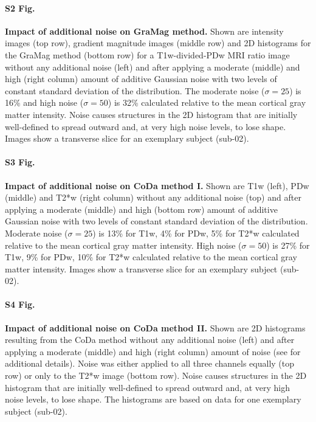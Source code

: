 \paragraph{S2 Fig.}
\label{S2_Fig}
{\bf Impact of additional noise on GraMag method.} Shown are intensity images (top row), gradient magnitude images (middle row) and 2D histograms for the GraMag method (bottom row) for a T1w-divided-PDw MRI ratio image without any additional noise (left) and after applying a moderate (middle) and high (right column) amount of additive Gaussian noise with two levels of constant standard deviation of the distribution. The moderate noise ($\sigma=25$) is 16\% and high noise ($\sigma=50$) is 32\% calculated relative to the mean cortical gray matter intensity. Noise causes structures in the 2D histogram that are initially well-defined to spread outward and, at very high noise levels, to lose shape. Images show a transverse slice for an exemplary subject (sub-02).

\paragraph{S3 Fig.}
\label{S3_Fig}
{\bf Impact of additional noise on CoDa method I.} Shown are T1w (left), PDw (middle) and T2*w (right column) without any additional noise (top) and after applying a moderate (middle) and high (bottom row) amount of additive Gaussian noise with two levels of constant standard deviation of the distribution. Moderate noise ($\sigma=25$) is 13\% for T1w, 4\% for PDw, 5\% for T2*w calculated relative to the mean cortical gray matter intensity. High noise ($\sigma=50$) is 27\% for T1w, 9\% for PDw, 10\% for T2*w calculated relative to the mean cortical gray matter intensity. Images show a transverse slice for an exemplary subject (sub-02).

\paragraph{S4 Fig.}
\label{S4_Fig}
{\bf Impact of additional noise on CoDa method II.} Shown are 2D histograms resulting from the CoDa method without any additional noise (left) and after applying a moderate (middle) and high (right column) amount of noise (see  for additional details). Noise was either applied to all three channels equally (top row) or only to the T2*w image (bottom row). Noise causes structures in the 2D histogram that are initially well-defined to spread outward and, at very high noise levels, to lose shape. The histograms are based on data for one exemplary subject (sub-02).

